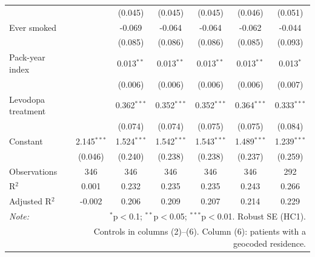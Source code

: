 \begin{tabular}{lcccccc}
 &  & (0.045) & (0.045) & (0.045) & (0.046) & (0.051) \\
Ever smoked &  & -0.069 & -0.064 & -0.064 & -0.062 & -0.044 \\
 &  & (0.085) & (0.086) & (0.086) & (0.085) & (0.093) \\
Pack-year index &  & 0.013$^{**}$ & 0.013$^{**}$ & 0.013$^{**}$ & 0.013$^{**}$ & 0.013$^{*}$ \\
 &  & (0.006) & (0.006) & (0.006) & (0.006) & (0.007) \\
Levodopa treatment &  & 0.362$^{***}$ & 0.352$^{***}$ & 0.352$^{***}$ & 0.364$^{***}$ & 0.333$^{***}$ \\
 &  & (0.074) & (0.074) & (0.075) & (0.075) & (0.084) \\
Constant & 2.145$^{***}$ & 1.524$^{***}$ & 1.542$^{***}$ & 1.543$^{***}$ & 1.489$^{***}$ & 1.239$^{***}$ \\
 & (0.046) & (0.240) & (0.238) & (0.238) & (0.237) & (0.259) \\
\hline
Observations & 346 & 346 & 346 & 346 & 346 & 292 \\
R$^2$ & 0.001 & 0.232 & 0.235 & 0.235 & 0.243 & 0.266 \\
Adjusted R$^2$ & -0.002 & 0.206 & 0.209 & 0.207 & 0.214 & 0.229 \\
\hline\hline
\textit{Note:} & \multicolumn{6}{r}{$^{*}$p$<$0.1; $^{**}$p$<$0.05; $^{***}$p$<$0.01. Robust SE (HC1).} \\
 & \multicolumn{6}{r}{Controls in columns (2)--(6). Column (6): patients with a geocoded residence.} \\
\end{tabular}
